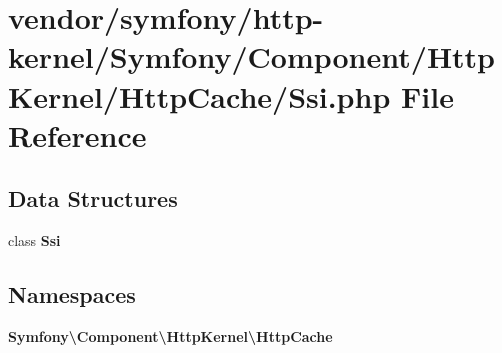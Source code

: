 \section{vendor/symfony/http-\/kernel/\+Symfony/\+Component/\+Http\+Kernel/\+Http\+Cache/\+Ssi.php File Reference}
\label{_ssi_8php}
\subsection*{Data Structures}
\begin{DoxyCompactItemize}
\item 
class {\bf Ssi}
\end{DoxyCompactItemize}
\subsection*{Namespaces}
\begin{DoxyCompactItemize}
\item 
 {\bf Symfony\textbackslash{}\+Component\textbackslash{}\+Http\+Kernel\textbackslash{}\+Http\+Cache}
\end{DoxyCompactItemize}
